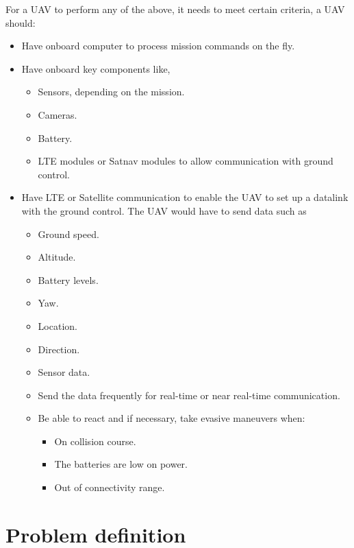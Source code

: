 For a UAV to perform any of the above, it needs to meet certain criteria, a UAV should:
\begin{itemize}
    \item Have onboard computer to process mission commands on the fly.
    \item Have onboard key components like,
          \begin{itemize}
              \item Sensors, depending on the mission.
              \item Cameras.
              \item Battery.
              \item LTE modules or Satnav modules to allow communication with ground control.
          \end{itemize}
    \item Have LTE or Satellite communication to enable the UAV to set up a datalink with the ground control. The UAV would have to send data such as
          \begin{itemize}
              \item	Ground speed.
              \item	Altitude.
              \item	Battery levels.
              \item	Yaw.
              \item	Location.
              \item	Direction.
              \item	Sensor data.
              \item	Send the data frequently for real-time or near real-time communication.
              \item	Be able to react and if necessary, take evasive maneuvers when:
                    \begin{itemize}
                        \item On collision course.
                        \item The batteries are low on power.
                        \item Out of connectivity range.
                    \end{itemize}
          \end{itemize}
\end{itemize}


\section{Problem definition}
\label{sec:problem-definition}


